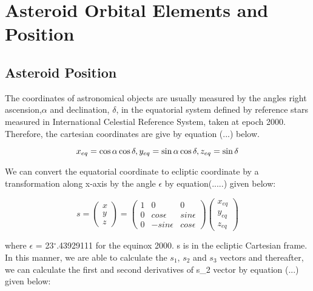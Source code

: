 \documentclass[letterpaper,12pt]{article}
\begin{document}
\section{Asteroid Orbital Elements and Position}
\subsection{Asteroid Position}
The coordinates of astronomical objects are usually measured by the angles right ascension,\begin{math}\alpha \end{math} and declination, \begin{math} \delta \end{math}, in the equatorial system defined by reference stars measured in International Celestial Reference System, taken at epoch 2000. Therefore, the cartesian coordinates are give by equation (...) below.

\begin{equation}
x_{eq}=\cos\alpha \cos\delta, \\ 
y_{eq}=\sin\alpha \cos\delta , \\ 
z_{eq}=\sin\delta
\end{equation}

We can convert the equatorial coordinate to ecliptic coordinate by a transformation along x-axis by the angle \begin{math} \epsilon \end{math} by equation(.....) given below:

\begin{equation}
s=
\begin{pmatrix}
  x \\
  y \\
  z
 \end{pmatrix} 
  =
\begin{pmatrix}
1 & 0 & 0 \\ 
 0 & cos\epsilon & sin\epsilon\\ 
 0 & -sin\epsilon & cos\epsilon
\end{pmatrix}
\begin{pmatrix}
  x_{eq} \\
  y_{eq} \\
  z_{eq}
\end{pmatrix} 
\end{equation}

where \begin{math}\epsilon\end{math} = 23\begin{math} ^{\circ} \end{math}.43929111 for the equinox 2000. s is in the ecliptic Cartesian frame.
In this manner, we are able to calculate the \begin{math}s_{1}\end{math}, \begin{math}s_{2}\end{math} and \begin{math}s_{3}\end{math} vectors and thereafter, we can calculate the first and second derivatives of s_{2} vector by equation (...) given below:
\end{document}
